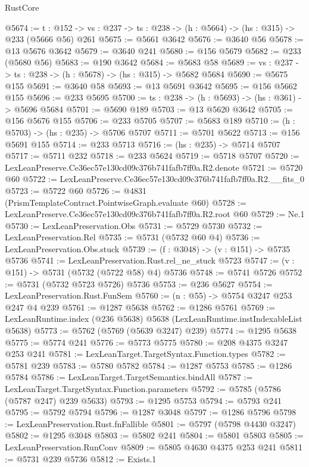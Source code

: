 \begin{lexlean}{RustCore}
\begin{coremodule}
@5674 := {t : @152} ->
  {vs : @237} -> {ts : @238} -> (h : @5664) -> (hs : @315) -> @233 (@5666 @56) @261
@5675 := @5661 @3642
@5676 := @3640 @56
@5678 := @13 @5676 @3642
@5679 := @3640 @241
@5680 := @156 @5679
@5682 := @233 (@5680 @56)
@5683 := @190 @3642
@5684 := @5683 @58
@5689 := {vs : @237} -> {ts : @238} -> (h : @5678) -> (hs : @315) -> @5682 @5684
@5690 := @5675 @155
@5691 := @3640 @58
@5693 := @13 @5691 @3642
@5695 := @156 @5662 @155
@5696 := @233 @5695
@5700 := {ts : @238} -> (h : @5693) -> (hs : @361) -> @5696 @5684
@5701 := @5690 @189
@5703 := @13 @5620 @3642
@5705 := @156 @5676 @155
@5706 := @233 @5705
@5707 := @5683 @189
@5710 := (h : @5703) -> (hs : @235) -> @5706 @5707
@5711 := @5701 @5622
@5713 := @156 @5691 @155
@5714 := @233 @5713
@5716 := (hs : @235) -> @5714 @5707
@5717 := @5711 @232
@5718 := @233 @5624
@5719 := @5718 @5707
@5720 := LexLeanPreserve.Ce36ec57e130cd09c376b741fafb7ff0a.R2.denote
@5721 := @5720 @60
@5722 := LexLeanPreserve.Ce36ec57e130cd09c376b741fafb7ff0a.R2.__fits_0
@5723 := @5722 @60
@5726 := @4831 (PrismTemplateContract.PointwiseGraph.evaluate @60)
@5728 := LexLeanPreserve.Ce36ec57e130cd09c376b741fafb7ff0a.R2.root @60
@5729 := Ne.{1}
@5730 := LexLeanPreservation.Obs
@5731 := @5729 @5730
@5732 := LexLeanPreservation.Rel
@5735 := @5731 (@5732 @60 @4)
@5736 := LexLeanPreservation.Obs.stuck
@5739 := (f : @3048) -> (v : @151) -> @5735 @5736
@5741 := LexLeanPreservation.Rust.rel_ne_stuck @5723
@5747 := (v : @151) -> @5731 (@5732 (@5722 @58) @4) @5736
@5748 := @5741 @5726
@5752 := @5731 (@5732 @5723 @5726) @5736
@5753 := @236 @5627
@5754 := LexLeanPreservation.Rust.FunSem
@5760 := (n : @55) -> @5754 @3247 @253 @247 @4 @239
@5761 := @1287 @5638
@5762 := @1286 @5761
@5769 := LexLeanRuntime.index (@236 @5638) @5638 (LexLeanRuntime.instIndexableList @5638)
@5773 := @5762 (@5769 (@5639 @3247) @239)
@5774 := @1295 @5638
@5775 := @5774 @241
@5776 := @5773 @5775
@5780 := @208 @4375 @3247 @253 @241
@5781 := LexLeanTarget.TargetSyntax.Function.types
@5782 := @5781 @239
@5783 := @5780 @5782
@5784 := @1287 @5753
@5785 := @1286 @5784
@5786 := LexLeanTarget.TargetSemantics.bindAll
@5787 := LexLeanTarget.TargetSyntax.Function.parameters
@5792 := @5785 (@5786 (@5787 @247) @239 @5633)
@5793 := @1295 @5753
@5794 := @5793 @241
@5795 := @5792 @5794
@5796 := @1287 @3048
@5797 := @1286 @5796
@5798 := LexLeanPreservation.Rust.fnFallible
@5801 := @5797 (@5798 @4430 @3247)
@5802 := @1295 @3048
@5803 := @5802 @241
@5804 := @5801 @5803
@5805 := LexLeanPreservation.RunConv
@5809 := @5805 @4630 @4375 @253 @241
@5811 := @5731 @239 @5736
@5812 := Exists.{1}

\end{coremodule}
\end{lexlean}
